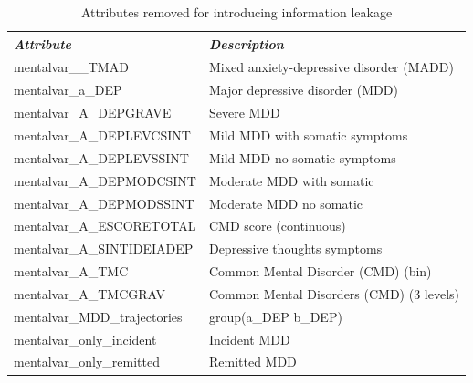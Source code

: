 \begin{table}[h]
    \caption{Attributes removed for introducing information leakage}
    \begin{center}
        \begin{tabular}{l|l}
            \textit{Attribute}           & \textit{Description}                     \\
            \hline
            \hline
            mentalvar\_\_TMAD            & Mixed anxiety-depressive disorder (MADD) \\
            mentalvar\_a\_DEP            & Major depressive disorder (MDD)          \\
            mentalvar\_A\_DEPGRAVE       & Severe MDD                               \\
            mentalvar\_A\_DEPLEVCSINT    & Mild MDD with somatic symptoms           \\
            mentalvar\_A\_DEPLEVSSINT    & Mild MDD no somatic symptoms             \\
            mentalvar\_A\_DEPMODCSINT    & Moderate MDD with somatic                \\
            mentalvar\_A\_DEPMODSSINT    & Moderate MDD no somatic                  \\
            mentalvar\_A\_ESCORETOTAL    & CMD score (continuous)                   \\
            mentalvar\_A\_SINTIDEIADEP   & Depressive thoughts symptoms             \\
            mentalvar\_A\_TMC            & Common Mental Disorder (CMD) (bin)       \\
            mentalvar\_A\_TMCGRAV        & Common Mental Disorders (CMD) (3 levels) \\
            mentalvar\_MDD\_trajectories & group(a\_DEP b\_DEP)                     \\
            mentalvar\_only\_incident    & Incident MDD                             \\
            mentalvar\_only\_remitted    & Remitted MDD                             \\
            \hline
        \end{tabular}
    \end{center}
    \label{tab:removed-info-leak}
\end{table}

